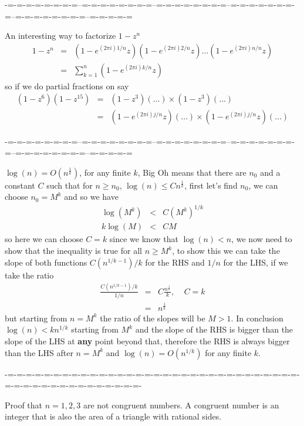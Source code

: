 \documentclass[aps,preprint,preprintnumbers,nofootinbib,showpacs,prd]{revtex4-1}
\newcommand{\nbea}{\begin{eqnarray*}}
\newcommand{\neea}{\end{eqnarray*}}
\begin{document}
-=-=-=-=-=-=-=-=--=-=-=-=-=-=-=-=--=-=-=-=-=-=-=-=--=-=-=-=-=-=-=-=--=-=-=-=-=-=-=-=--=-=-=-=-=

An interesting way to factorize $1-z^n$
%
\nbea
1-z^n & = &(1-e^{(2\pi i) 1/n}z)(1-e^{(2\pi i) 2/n}z) \ldots (1-e^{(2\pi i) n/n}z) \\
& = & \sum_{k=1}^{n} (1-e^{(2\pi i)k/n}z)
\neea
%
so if we do partial fractions on say
%
\nbea
(1-z^6)(1-z^{15}) & = & (1-z^3)(\ldots)\times(1-z^3)(\ldots) \\
& = & (1-e^{(2\pi i) j/n}z) (\ldots) \times (1-e^{(2\pi i) j/n}z)(\ldots)
\neea
%

-=-=-=-=-=-=-=-=--=-=-=-=-=-=-=-=--=-=-=-=-=-=-=-=--=-=-=-=-=-=-=-=--=-=-=-=-=-=-=-=--=-=-=-=-=

$\log(n) = O\left(n^{\frac{1}{k}}\right)$, for any finite $k$, Big Oh means that there are $n_0$ and a constant $C$ such that for $n\ge n_0$, $\log(n)\le Cn^{\frac{1}{k}}$, first let's find $n_0$, we can choose $n_0 = M^k$ and so we have
%
\nbea
\log(M^k) & < & C (M^k)^{1/k} \\
k\log(M) & < & C M
\neea
%
so here we can choose $C = k$ since we know that $\log(n) < n$, we now need to show that the inequality is true for all $n \ge M^k$, to show this we can take the slope of both functions $C(n^{1/k-1})/k$ for the RHS and $1/n$ for the LHS, if we take the ratio
%
\nbea
\frac{C(n^{1/k-1})/k}{1/n} & = & C\frac{n^{\frac{1}{k}}}{k}, ~~~~~ C = k \\
& = & n^{\frac1k} 
\neea
%
but starting from $n=M^{k}$ the ratio of the slopes will be $M > 1$. In conclusion $\log(n) < k n^{1/k}$ starting from $M^k$ and the slope of the RHS is bigger than the slope of the LHS at {\bf any} point beyond that, therefore the RHS is always bigger than the LHS after $n=M^k$ and $\log(n) = O(n^{1/k})$ for any finite $k$.

-=-=-=-=-=-=-=-=-=-=-=-=-=-=-=-=-=-=-=-=-=-=-=-=-=-=-=-=-=-=-=-=-=-=-=-=-=-=-=-=-=-=-=-=-=-=-=-

Proof that $n=1,2,3$ are not congruent numbers. A congruent number is an integer that is also the area of a triangle with rational sides.
\end{document}
